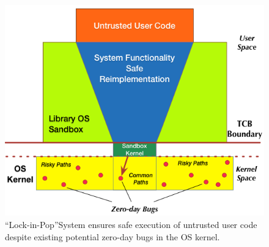 {\begin{figure}%
\centering
\includegraphics[width=1.0\columnwidth]{diagram/Virtualization_Design_Model_01.png}
\caption{\small ``Lock-in-Pop''System ensures safe execution of untrusted user code
despite existing potential zero-day bugs in the OS kernel.}
\label{fig:design_safe_reimplementation}
\end{figure}


%

\


}
